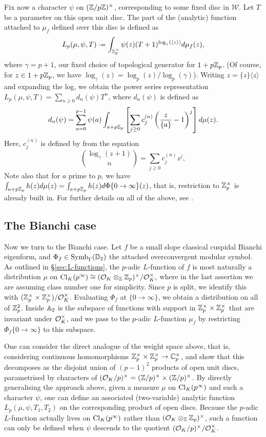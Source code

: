 \documentclass[a4paper,11pt]{article}
\newcommand{\W}{\mathcal{W}}
\numberwithin{equation}{section}
\begin{document}
Fix now a character $\psi$ on $(\mathbb{Z}/p\mathbb{Z})^\times$, corresponding to some fixed disc in $\W$. Let $T$ be a parameter on this open unit disc. The part of the (analytic) function attached to $\mu_f$ defined over this disc is defined as
\[
	L_p(\mu, \psi, T) \defeq \int_{\Zp^\times} \psi(z)(T+1)^{\log_{\gamma}(\langle z\rangle)} d\mu_f(z),
\]
 where $\gamma=p+1$, our fixed choice of topological generator for $1 + p\mathbb{Z}_p$. (Of course, for $z \in 1 + p\mathbb{Z}_p$, we have $\log_\gamma(z) = \log_p(z) / \log_p(\gamma)$). Writing $z = \{z\}\langle z\rangle$ and expanding the log, we obtain the power series representation $L_p(\mu,\psi,T) = \sum_{n\geq 0} d_n(\psi)T^n$, where $d_n(\psi)$ is defined as
\[
  d_n(\psi) =\sum_{a=0}^{p-1}\psi(a)  \int_{a+p\mathbb{Z}_p} \left[\sum_{j\geq 0} c_j^{(n)}\left(\frac{z}{\{a\}}-1\right)^j \right]d\mu(z).
\]
Here, $c_j^{(n)}$ is defined by from the equation
\begin{equation}\label{cjn}
  \binom{\log_{\gamma}(z+1)}{n} = \sum_{j\geq 0} c_j^{(n)} z^j,
\end{equation}
Note also that for $a$ prime to $p$, we have $\int_{a+p\mathbb{Z}_p}h(z) d\mu(z) = \int_{a+p\mathbb{Z}_p}h(z)d\Phi\{0\to\infty\}(z)$, that is, restriction to $\mathbb{Z}_p^\times$ is already built in. For further details on all of the above, see \cite[\S9]{PS11}.

\subsection{The Bianchi case}
Now we turn to the Bianchi case. Let $f$ be a small slope classical cuspidal Bianchi eigenform, and $\Phi_f \in \mathrm{Symb}_{\Gamma}(\mathbb{D}_2)$ the attached overconvergent modular symbol. As outlined in \S\ref{sec:L-functions}, the $p$-adic $L$-function of $f$ is most naturally a distribution $\mu$ on $\mathrm{Cl}_K(p^\infty) \cong (\mathcal{O}_K\otimes_{\mathbb{Z}}\mathbb{Z}_p)^\times/\mathcal{O}_K^\times,$ where in the last assertion we are assuming class number one for simplicity. Since $p$ is split, we identify this with $(\mathbb{Z}_p^\times \times \mathbb{Z}_p^\times)/\mathcal{O}_K^\times$. Evaluating $\Phi_f$ at $\{0\rightarrow\infty\}$, we obtain a distribution on all of $\mathbb{Z}_p^2$. Inside $\mathbb{A}_2$ is the subspace of functions with support in $\mathbb{Z}_p^\times \times \mathbb{Z}_p^\times$ that are invariant under $\mathcal{O}_K^\times$, and we pass to the $p$-adic $L$-function $\mu_f$ by restricting $\Phi_f\{0\to\infty\}$ to this subspace.

One can consider the direct analogue of the weight space above, that is, considering continuous homomorphisms $\mathbb{Z}_p^\times \times \mathbb{Z}_p^\times \rightarrow \mathbb{C}_p^\times$, and show that this decomposes as the disjoint union of $(p-1)^2$ products of open unit discs, parametrised by characters of $(\mathcal{O}_K/p)^\times = (\mathbb{Z}/p)^\times \times (\mathbb{Z}/p)^\times$. By directly generalising the approach above, given a measure $\mu$ on $\mathrm{Cl}_K(p^\infty)$ and such a character $\psi$, one can define an associated (two-variable) analytic function $L_p(\mu,\psi,T_1,T_2)$ on the corresponding product of open discs. Because the $p$-adic $L$-function actually lives on $\mathrm{Cl}_K(p^\infty)$ rather than $(\mathcal{O}_K\otimes_{\mathbb{Z}}\mathbb{Z}_p)^\times$, such a function can only be defined when $\psi$ descends to the quotient $(\mathcal{O}_K/p)^\times/\mathcal{O}_K^\times$.
\end{document}
